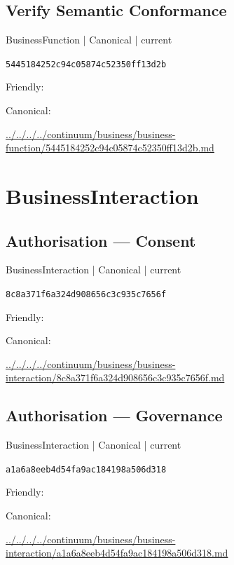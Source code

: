 \documentclass[10pt,a4paper]{article}
\begin{document}
\subsection*{Verify Semantic Conformance}
{\small BusinessFunction | Canonical | current}\par
\texttt{5445184252c94c05874c52350ff13d2b}\par
Friendly: \par
Canonical: \par
{\footnotesize\url{../../../../continuum/business/business-function/5445184252c94c05874c52350ff13d2b.md}}\par
\section*{BusinessInteraction}
\subsection*{Authorisation — Consent}
{\small BusinessInteraction | Canonical | current}\par
\texttt{8c8a371f6a324d908656c3c935c7656f}\par
Friendly: \par
Canonical: \par
{\footnotesize\url{../../../../continuum/business/business-interaction/8c8a371f6a324d908656c3c935c7656f.md}}\par
\subsection*{Authorisation — Governance}
{\small BusinessInteraction | Canonical | current}\par
\texttt{a1a6a8eeb4d54fa9ac184198a506d318}\par
Friendly: \par
Canonical: \par
{\footnotesize\url{../../../../continuum/business/business-interaction/a1a6a8eeb4d54fa9ac184198a506d318.md}}\par
\end{document}
